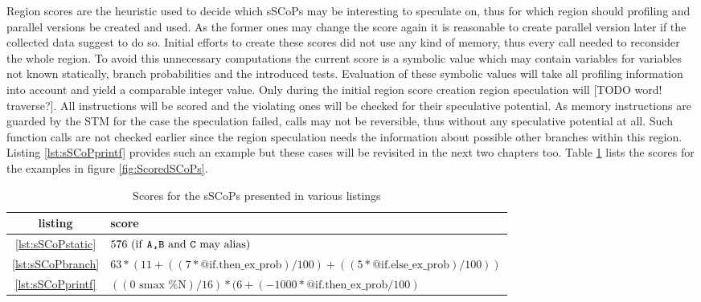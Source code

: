 \begin{shaded}
Region scores are the heuristic used to decide which sSCoPs may be interesting
to speculate on, thus for which region should profiling and parallel versions
be created and used. As the former ones may change the score again it is 
reasonable to create parallel version later if the collected data suggest to do
so. Initial efforts to create these scores did not use any kind of 
memory, thus every call needed to reconsider the whole region. To avoid this
unnecessary computations the current score is a symbolic value which may contain
variables for variables not known statically, branch probabilities and the 
introduced tests. Evaluation of these symbolic values will take all profiling
information into account and yield a comparable integer value. 
Only during the initial region score creation region speculation will
[TODO word! traverse?]. All instructions will be scored and the violating ones
will be checked for their speculative potential.
As memory instructions are 
guarded by the STM for the case the speculation failed, calls may not be
reversible, thus without any speculative potential at all. Such function calls
are not checked earlier since the region speculation needs the information about
possible other branches within this region. Listing \ref{lst:sSCoPprintf} 
provides such an example but these cases will be revisited in the next 
two chapters too. Table \ref{tab:Scores} lists the scores for the examples in 
figure \ref{fig:ScoredSCoPs}. 

\end{shaded}

\begin{table}[htbp]
  \centering
  \caption{Scores for the sSCoPs presented in various listings}
  \begin{tabular}{ c l}
    listing & score \\
    \hline
    \ref{lst:sSCoPstatic} & $ 576 \hfill \text{  (if \texttt{A,B} and \texttt{C} may alias)} $ \\
    \ref{lst:sSCoPbranch} & $63 * (11 + ((7 * \text{@if.then\_ex\_prob}) / 100) + ((5 * \text{@if.else\_ex\_prob}) / 100)) $ \\
    \ref{lst:sSCoPprintf} & $((0\text{ smax }\%\text{N}) / 16) * (6 + (-1000 * \text{@if.then\_ex\_prob} / 100)$ \\
   \end{tabular}
  \label{tab:Scores}
\end{table}

